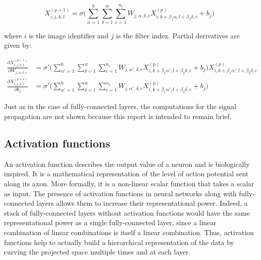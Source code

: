         \begin{equation} \label{eq:conv2D}
            X_{i, j, k, l}^{(p+1)} = \sigma \Big( \sum\limits_{\alpha=1}^h \sum\limits_{\delta=1}^w
                \sum\limits_{c=1}^{n_c} W_{j, \alpha, \delta, c} X_{i, k+\beta_1 \alpha, l+\beta_2 \delta, c}^{(p)} + b_{j} \Big)
        \end{equation}

        where $i$ is the image identifier and $j$ is the filter index.
        Partial derivatives are given by:

        \begin{align}
            \frac{\partial X_{i, j, k, l}^{(p+1)}}{\partial W_{j, \alpha, \delta, c}} & =
                \sigma' \Big( \sum\limits_{\alpha'=1}^h \sum\limits_{\delta=1}^w \sum\limits_{c=1}^{n_c} W_{j, \alpha', \delta, c}
                X_{i, k+\beta_1 \alpha', l+\beta_2 \delta, c}^{(p)} + b_{j} \Big) X_{i, k+\beta_1 \alpha', l+\beta_2 \delta, c}^{(p)} \\
            \frac{\partial X_{i, j, k, l}^{(p+1)}}{\partial b_{j}} & =
                \sigma' \Big( \sum\limits_{\alpha'=1}^h \sum\limits_{\delta=1}^w \sum\limits_{c=1}^{n_c} W_{j, \alpha', \delta, c}
                X_{i, k+\beta_1 \alpha', l+\beta_2 \delta, c}^{(p)} + b_{j} \Big)
        \end{align}

        Just as in the case of fully-connected layers, the computations for the signal propagation
        are not shown because this report is intended to remain brief.

    \subsection{Activation functions}\label{activationfunctions}

        An activation function describes the output value of a neuron and is biologically inspired. It is a mathematical representation
        of the level of action potential sent along its axon. More formally, it is a non-linear scalar function that takes a scalar as input.
        The presence of activation functions in neural networks along with fully-connected layers allows them to increase their representational
        power. Indeed, a stack of fully-connected layers without activation functions would have the same representational power as a single
        fully-connected layer, since a linear combination of linear combinations is itself a linear combination. Thus, activation functions
        help to actually build a hierarchical representation of the data by curving the projected space multiple times and at each layer.


